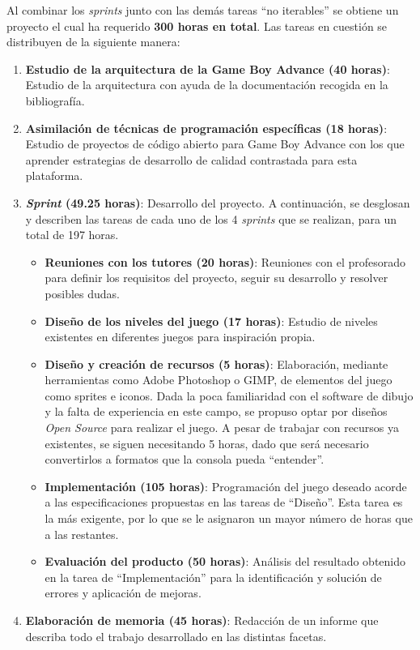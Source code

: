 Al combinar los \textit{sprints} junto con las demás tareas ``no iterables'' se obtiene un proyecto el cual ha requerido \textbf{300 horas en total}. Las tareas en cuestión se distribuyen de la siguiente manera:

\begin{enumerate}
	\item \textbf{Estudio de la arquitectura de la Game Boy Advance (40 horas)}: Estudio de la arquitectura con ayuda de la documentación recogida en la bibliografía.
	\item \textbf{Asimilación de técnicas de programación específicas (18 horas)}: Estudio de proyectos de código abierto para Game Boy Advance con los que aprender estrategias de desarrollo de calidad contrastada para esta plataforma.
	\item \textbf{\textit{Sprint} (49.25 horas)}: Desarrollo del proyecto. A continuación, se desglosan y describen las tareas de cada uno de los 4 \textit{sprints} que se realizan, para un total de 197 horas.
		\begin{itemize}
			\item \textbf{Reuniones con los tutores (20 horas)}: Reuniones con el profesorado para definir los requisitos del proyecto, seguir su desarrollo y resolver posibles dudas.
			\item \textbf{Diseño de los niveles del juego (17 horas)}: Estudio de niveles existentes en diferentes juegos para inspiración propia.
			\item \textbf{Diseño y creación de recursos (5 horas)}: Elaboración, mediante herramientas como Adobe Photoshop o GIMP, de elementos del juego como sprites e iconos. Dada la poca familiaridad con el software de dibujo y la falta de experiencia en este campo, se propuso optar por diseños \textit{Open Source} para realizar el juego. A pesar de trabajar con recursos ya existentes, se siguen necesitando 5 horas, dado que será necesario convertirlos a formatos que la consola pueda ``entender''.
			\item \textbf{Implementación (105 horas)}: Programación del juego deseado acorde a las especificaciones propuestas en las tareas de ``Diseño''. Esta tarea es la más exigente, por lo que se le asignaron un mayor número de horas que a las restantes. 
			\item \textbf{Evaluación del producto (50 horas)}: Análisis del resultado obtenido en la tarea de ``Implementación'' para la identificación y solución de errores y aplicación de mejoras.
		\end{itemize}
	\item \textbf{Elaboración de memoria (45 horas)}: Redacción de un informe que describa todo el trabajo desarrollado en las distintas facetas.
\end{enumerate}

